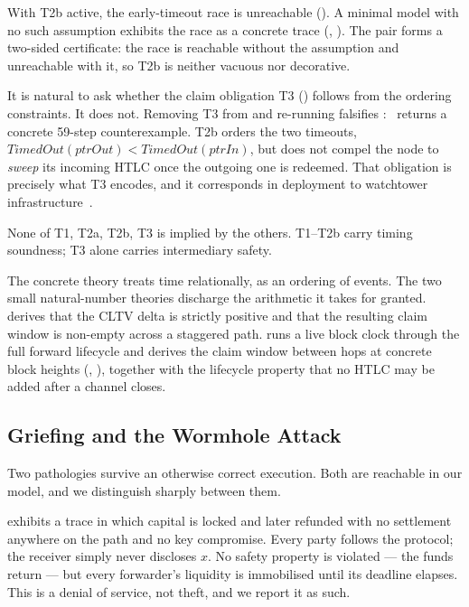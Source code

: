 With T2b active, the early-timeout race is unreachable
(). A minimal model with no such assumption
exhibits the race as a concrete trace (,
). The pair forms a two-sided certificate: the race
is reachable without the assumption and unreachable with it, so T2b is neither
vacuous nor decorative.

It is natural to ask whether the claim obligation T3
() follows from the ordering constraints. It does
not. Removing T3 from  and re-running falsifies
: \mtamarin\ returns a concrete 59-step counterexample.
T2b orders the two timeouts, $\mathit{TimedOut}(\mathit{ptrOut}) <
\mathit{TimedOut}(\mathit{ptrIn})$, but does not compel the node to
\emph{sweep} its incoming HTLC once the outgoing one is redeemed. That
obligation is precisely what T3 encodes, and it corresponds in deployment to
watchtower infrastructure~\cite{mccorry2019pisa}.

\begin{inv}
\label{inv:minimality}
None of T1, T2a, T2b, T3 is implied by the others. T1--T2b carry timing
soundness; T3 alone carries intermediary safety.
\end{inv}

The concrete theory treats time relationally, as an ordering of events. The two
small natural-number theories discharge the arithmetic it takes for granted.
 derives that the CLTV delta is strictly positive and that the
resulting claim window is non-empty across a staggered path.
 runs a live block clock through the full forward lifecycle
and derives the claim window between hops at concrete block heights
(,
), together with the
lifecycle property that no HTLC may be added after a channel closes.

\subsection{Griefing and the Wormhole Attack}

Two pathologies survive an otherwise correct execution. Both are reachable in
our model, and we distinguish sharply between them.

 exhibits a trace in which capital is
locked and later refunded with no settlement anywhere on the path and no key
compromise. Every party follows the protocol; the receiver simply never
discloses $x$. No safety property is violated --- the funds return --- but every
forwarder's liquidity is immobilised until its deadline elapses. This is a
denial of service, not theft, and we report it as such.

